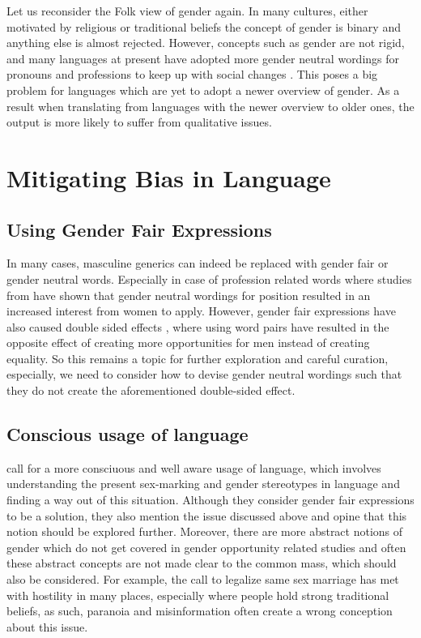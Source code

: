 \documentclass{article}
\begin{document}
\noindent
Let us reconsider the Folk view of gender again. In many cultures, either motivated by religious or traditional beliefs the concept of gender is binary and anything else is almost rejected. However, concepts such as gender are not rigid, and many languages at present have adopted more gender neutral wordings for pronouns and professions to keep up with social changes \cite{misersky2019grammatical}. This poses a big problem for languages which are yet to adopt a newer overview of gender. As a result when translating from languages with the newer overview to older ones, the output is more likely to suffer from qualitative issues. 



\section*{Mitigating Bias in Language}

\subsection*{Using Gender Fair Expressions}
In many cases, masculine generics can indeed be replaced with gender fair or gender neutral words. Especially in case of profession related words where studies from \cite{bem1973does} have shown that gender neutral wordings for position resulted in an increased interest from women to apply. However, gender fair expressions have also caused double sided effects \cite{horvath2016does}, where using word pairs have resulted in the opposite effect of creating more opportunities for men instead of creating equality. So this remains a topic for further exploration and careful curation, especially, we need to consider how to devise gender neutral wordings such that they do not create the aforementioned double-sided effect.

\subsection*{Conscious usage of language}
\cite{menegatti2017gender} call for a more consciuous and well aware usage of language, which involves understanding the present sex-marking and gender stereotypes in language and finding a way out of this situation. Although they consider gender fair expressions to be a solution, they also mention the issue discussed above and opine that this notion should be explored further. Moreover, there are more abstract notions of gender which do not get covered in gender opportunity related studies and often these abstract concepts are not made clear to the common mass, which should also be considered. For example, the call to legalize same sex marriage has met with hostility in many places, especially where people hold strong traditional beliefs, as such, paranoia and misinformation often create a wrong conception about this issue.  
\end{document}
